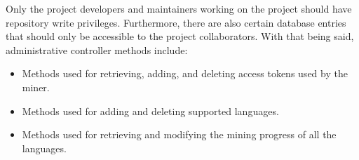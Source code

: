\begin{itemize}
    Only the project developers and maintainers working on the project should have repository write privileges.
    Furthermore, there are also certain database entries that should only be accessible to the project collaborators.
    With that being said, administrative controller methods include:
    \begin{itemize}
        \item Methods used for retrieving, adding, and deleting access tokens used by the miner.
        \item Methods used for adding and deleting supported languages.
        \item Methods used for retrieving and modifying the mining progress of all the languages.
    \end{itemize}
\end{itemize}